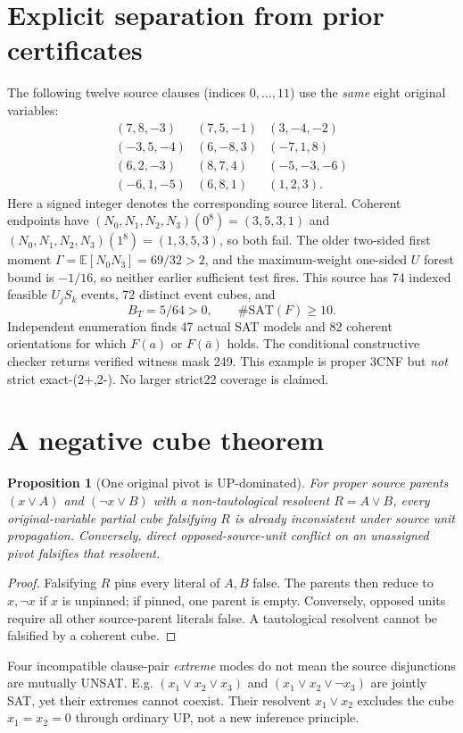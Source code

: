 \documentclass[10pt]{article}
\newtheorem{proposition}{Proposition}
\begin{document}
\section{Explicit separation from prior certificates}
The following twelve source clauses (indices $0,\dots,11$) use the \emph{same} eight original variables:
\[
\begin{array}{lll}
(7,8,-3)&(7,5,-1)&(3,-4,-2)\\
(-3,5,-4)&(6,-8,3)&(-7,1,8)\\
(6,2,-3)&(8,7,4)&(-5,-3,-6)\\
(-6,1,-5)&(6,8,1)&(1,2,3).
\end{array}
\]
Here a signed integer denotes the corresponding source literal. Coherent endpoints have $(N_0,N_1,N_2,N_3)(0^8)=(3,5,3,1)$ and $(N_0,N_1,N_2,N_3)(1^8)=(1,3,5,3)$, so both fail. The older two-sided first moment $\Gamma=\mathbb E[N_0N_3]=69/32>2$, and the maximum-weight one-sided $U$ forest bound is $-1/16$, so neither earlier sufficient test fires. This source has 74 indexed feasible $U_jS_k$ events, 72 distinct event cubes, and
\[
\boxed{B_T=5/64>0,\qquad \#\mathrm{SAT}(F)\ge10.}
\]
Independent enumeration finds 47 actual SAT models and 82 coherent orientations for which $F(a)$ or $F(\bar a)$ holds. The conditional constructive checker returns verified witness mask 249. This example is proper 3CNF but \emph{not} strict exact-(2+,2-). No larger strict22 coverage is claimed.
\section{A negative cube theorem}
\begin{proposition}[One original pivot is UP-dominated]
For proper source parents $(x\lor A)$ and $(\neg x\lor B)$ with a non-tautological resolvent $R=A\lor B$, every original-variable partial cube falsifying $R$ is already inconsistent under source unit propagation. Conversely, direct opposed-source-unit conflict on an unassigned pivot falsifies that resolvent.
\end{proposition}
\begin{proof}
Falsifying $R$ pins every literal of $A,B$ false. The parents then reduce to $x,\neg x$ if $x$ is unpinned; if pinned, one parent is empty. Conversely, opposed units require all other source-parent literals false. A tautological resolvent cannot be falsified by a coherent cube.
\end{proof}
Four incompatible clause-pair \emph{extreme} modes do not mean the source disjunctions are mutually UNSAT. E.g. $(x_1\lor x_2\lor x_3)$ and $(x_1\lor x_2\lor\neg x_3)$ are jointly SAT, yet their extremes cannot coexist. Their resolvent $x_1\lor x_2$ excludes the cube $x_1=x_2=0$ through ordinary UP, not a new inference principle.
\end{document}
